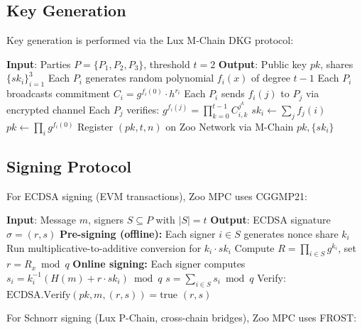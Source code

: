 \subsection{Key Generation}

Key generation is performed via the Lux M-Chain DKG protocol:

\begin{algorithm}[t]
\caption{Zoo MPC Key Generation}
\label{alg:keygen}
\begin{algorithmic}[1]
\STATE \textbf{Input}: Parties $P = \{P_1, P_2, P_3\}$, threshold $t = 2$
\STATE \textbf{Output}: Public key $pk$, shares $\{sk_i\}_{i=1}^3$
\STATE Each $P_i$ generates random polynomial $f_i(x)$ of degree $t - 1$
\STATE Each $P_i$ broadcasts commitment $C_i = g^{f_i(0)} \cdot h^{r_i}$
\STATE Each $P_i$ sends $f_i(j)$ to $P_j$ via encrypted channel
\STATE Each $P_j$ verifies: $g^{f_i(j)} = \prod_{k=0}^{t-1} C_{i,k}^{j^k}$
\STATE $sk_i \leftarrow \sum_{j} f_j(i)$
\STATE $pk \leftarrow \prod_{i} g^{f_i(0)}$
\STATE Register $(pk, t, n)$ on Zoo Network via M-Chain
\RETURN $pk, \{sk_i\}$
\end{algorithmic}
\end{algorithm}

\subsection{Signing Protocol}

For ECDSA signing (EVM transactions), Zoo MPC uses CGGMP21:

\begin{algorithm}[t]
\caption{CGGMP21 Threshold Signing on Zoo}
\label{alg:sign}
\begin{algorithmic}[1]
\STATE \textbf{Input}: Message $m$, signers $S \subseteq P$ with $|S| = t$
\STATE \textbf{Output}: ECDSA signature $\sigma = (r, s)$
\STATE \textbf{Pre-signing (offline):}
\STATE Each signer $i \in S$ generates nonce share $k_i$
\STATE Run multiplicative-to-additive conversion for $k_i \cdot sk_i$
\STATE Compute $R = \prod_{i \in S} g^{k_i}$, set $r = R_x \bmod q$
\STATE \textbf{Online signing:}
\STATE Each signer computes $s_i = k_i^{-1}(H(m) + r \cdot sk_i) \bmod q$
\STATE $s = \sum_{i \in S} s_i \bmod q$
\STATE Verify: $\text{ECDSA.Verify}(pk, m, (r, s)) = \text{true}$
\RETURN $(r, s)$
\end{algorithmic}
\end{algorithm}

For Schnorr signing (Lux P-Chain, cross-chain bridges), Zoo MPC uses FROST:

